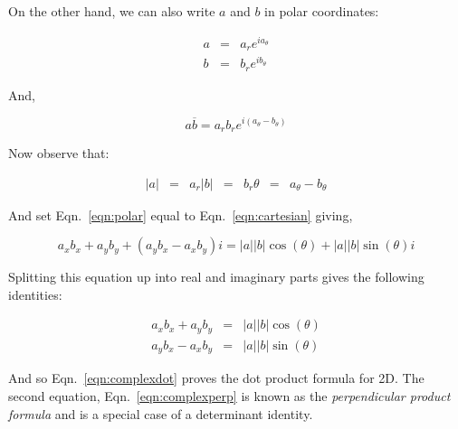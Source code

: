 \documentclass{article}[11pt]
\begin{document}
On the other hand, we can also write $a$ and $b$ in polar coordinates:

\begin{eqnarray*}
a & = & a_r e^{i a_\theta} \\
b & = & b_r e^{i b_\theta}
\end{eqnarray*}

And,

\begin{equation}
\label{eqn:polar}
a \overline{b} = a_r b_r e^{i (a_\theta - b_\theta)}
\end{equation}

Now observe that:

\begin{eqnarray*}
|a| & = & a_r
|b| & = & b_r
\theta & = & a_\theta - b_\theta
\end{eqnarray*}

And set Eqn.~\ref{eqn:polar} equal to Eqn.~\ref{eqn:cartesian} giving,

\begin{equation}
a_x b_x + a_y b_y + (a_y b_x - a_x b_y) i = |a| |b| \cos(\theta) + |a| |b| \sin(\theta) i
\end{equation}

Splitting this equation up into real and imaginary parts gives the following identities:

\begin{eqnarray}
\label{eqn:complexdot} a_x b_x + a_y b_y & = & |a| |b| \cos(\theta) \\
\label{eqn:complexperp} a_y b_x - a_x b_y & = & |a| |b| \sin(\theta)
\end{eqnarray}

And so Eqn.~\ref{eqn:complexdot} proves the dot product formula for 2D.  The second equation, Eqn.~\ref{eqn:complexperp} is known as the \emph{perpendicular product formula} and is a special case of a determinant identity.
\end{document}
